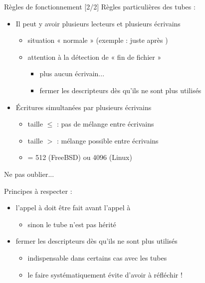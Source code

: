\begin {frame} {Règles de fonctionnement [2/2]}
    Règles particulières des tubes :
    \begin {itemize}
	\item Il peut y avoir plusieurs lecteurs et plusieurs écrivains
	    \begin {itemize}
		\item situation « normale » (exemple : juste après )
		\item attention à la détection de « fin de fichier »
		    \begin {itemize}
			\item plus aucun écrivain...
			\item \implique fermer les descripteurs dès
			    qu'ils ne sont plus utilisés
		    \end {itemize}
	    \end {itemize}

	\item Écritures simultanées par plusieurs écrivains
	    \begin {itemize}
		\item taille $\leq$  : pas de mélange
		    entre écrivains
		\item taille $>$  : mélange possible
		    entre écrivains
		\item {} = 512 (FreeBSD) ou 4096 (Linux)
	    \end {itemize}

    \end {itemize}
\end {frame}

\begin {frame} {Ne pas oublier...}

    Principes à respecter :

    \begin {itemize}
	\item l'appel à  doit être fait \alert {avant}
	    l'appel à 
	    \begin {itemize}
		\item sinon le tube n'est pas hérité
	    \end {itemize}
	\item \alert {fermer} les descripteurs dès qu'ils ne sont
	    plus utilisés
	    \begin {itemize}
		\item indispensable dans certains cas avec les tubes
		\item \implique le faire systématiquement évite d'avoir
		    à réfléchir !
	    \end {itemize}
    \end {itemize}
\end {frame}

